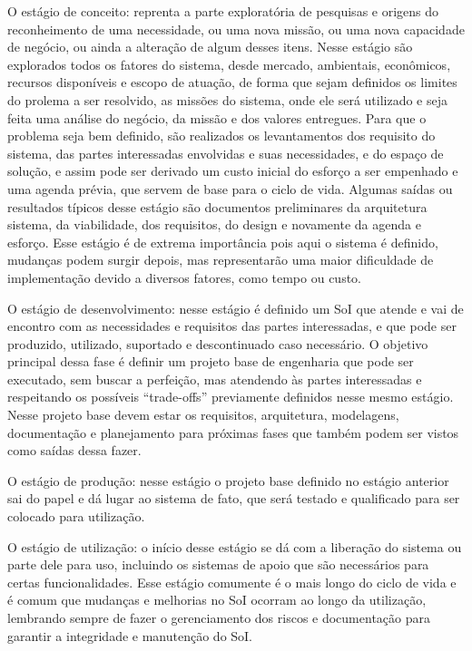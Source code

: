 	O estágio de conceito: reprenta a parte exploratória de pesquisas e origens do reconheimento de uma necessidade, ou uma nova missão, ou uma nova capacidade de negócio, ou
	ainda a alteração de algum desses itens. Nesse estágio são explorados todos os fatores do sistema, desde mercado, ambientais, econômicos, recursos disponíveis e escopo de
	atuação, de forma que sejam definidos os limites do prolema a ser resolvido, as missões do sistema, onde ele será utilizado e seja feita uma análise do negócio, da missão e
	dos valores entregues. Para que o problema seja bem definido, são realizados os levantamentos dos requisito do sistema, das partes interessadas envolvidas e suas necessidades,
	e do espaço de solução, e assim pode ser derivado um custo inicial do esforço a ser empenhado e uma agenda prévia, que servem de base para o ciclo de vida. Algumas saídas
	ou resultados típicos desse estágio são documentos preliminares da arquitetura sistema, da viabilidade, dos requisitos, do design e novamente da agenda e esforço. Esse
	estágio é de extrema importância pois aqui o sistema é definido, mudanças podem surgir depois, mas representarão uma maior dificuldade de implementação devido a diversos
	fatores, como tempo ou custo. 

	O estágio de desenvolvimento: nesse estágio é definido um SoI que atende e vai de encontro com as necessidades e requisitos das partes interessadas, e que pode ser
	produzido, utilizado, suportado e descontinuado caso necessário. O objetivo principal dessa fase é definir um projeto base de engenharia que pode ser executado, sem buscar a 
	perfeição, mas atendendo às partes interessadas e respeitando os possíveis ``trade-offs'' previamente definidos nesse mesmo estágio. Nesse projeto base devem estar os
	requisitos, arquitetura, modelagens, documentação e planejamento para próximas fases que também podem ser vistos como saídas dessa fazer.

	O estágio de produção: nesse estágio o projeto base definido no estágio anterior sai do papel e dá lugar ao sistema de fato, que será testado e qualificado para ser
	colocado para utilização.

	O estágio de utilização: o início desse estágio se dá com a liberação do sistema ou parte dele para uso, incluindo os sistemas de apoio que são necessários para certas
	funcionalidades. Esse estágio comumente é o mais longo do ciclo de vida e é comum que mudanças e melhorias no SoI ocorram ao longo da utilização, lembrando sempre de fazer
	o gerenciamento dos riscos e documentação para garantir a integridade e manutenção do SoI.

